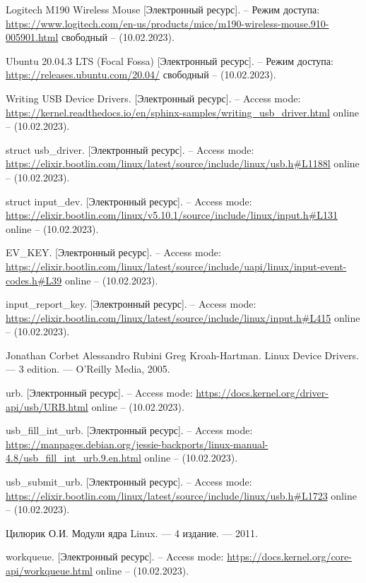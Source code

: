 \renewcommand\bibname{СПИСОК ИСПОЛЬЗОВАННЫХ ИСТОЧНИКОВ}
\begingroup
\renewcommand{\anonsection}[2]{}
\begin{thebibliography}{}
	Logitech M190 Wireless Mouse [Электронный ресурс]. – Режим доступа: \url{https://www.logitech.com/en-us/products/mice/m190-wireless-mouse.910-005901.html} свободный – (10.02.2023).
	
	Ubuntu 20.04.3 LTS (Focal Fossa) [Электронный ресурс]. – Режим доступа: 
	\url{https://releases.ubuntu.com/20.04/} свободный – (10.02.2023).
	
	Writing USB Device Drivers. [Электронный ресурс]. – Access mode: \url{https://kernel.readthedocs.io/en/sphinx-samples/writing_usb_driver.html} online – (10.02.2023).
	
	struct usb\_driver. [Электронный ресурс]. – Access mode: \url{https://elixir.bootlin.com/linux/latest/source/include/linux/usb.h#L1188l} online – (10.02.2023).
	
	struct input\_dev. [Электронный ресурс]. – Access mode: 
	\url{https://elixir.bootlin.com/linux/v5.10.1/source/include/linux/input.h#L131} online – (10.02.2023).
	
	EV\_KEY. [Электронный ресурс]. – Access mode: 
	\url{https://elixir.bootlin.com/linux/latest/source/include/uapi/linux/input-event-codes.h#L39} online – (10.02.2023).
	
	input\_report\_key. [Электронный ресурс]. – Access mode: 
	\url{https://elixir.bootlin.com/linux/latest/source/include/linux/input.h#L415} online – (10.02.2023).
	
	Jonathan Corbet Alessandro Rubini Greg Kroah-Hartman. Linux Device Drivers. –– 3 edition. –– O’Reilly Media, 2005.
	
	urb. [Электронный ресурс]. – Access mode: 
	\url{https://docs.kernel.org/driver-api/usb/URB.html} online – (10.02.2023).
	
	usb\_fill\_int\_urb. [Электронный ресурс]. – Access mode: 
	\url{https://manpages.debian.org/jessie-backports/linux-manual-4.8/usb_fill_int_urb.9.en.html} online – (10.02.2023).
	
	usb\_submit\_urb. [Электронный ресурс]. – Access mode: 
	\url{https://elixir.bootlin.com/linux/latest/source/include/linux/usb.h#L1723} online – (10.02.2023).
	
	Цилюрик О.И. Модули ядра Linux. –– 4 издание. –– 2011.
	
	workqueue. [Электронный ресурс]. – Access mode: 
	\url{https://docs.kernel.org/core-api/workqueue.html} online – (10.02.2023).
	
\end{thebibliography}
\endgroup
\newpage